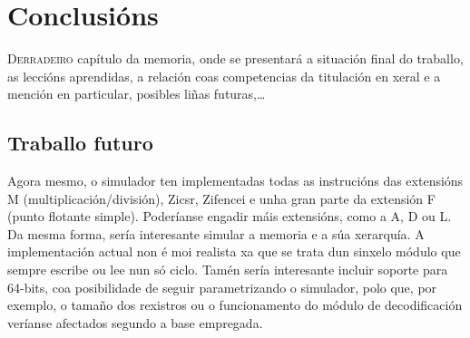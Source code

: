 \chapter{Conclusións}
\label{chap:conclusions}

\lettrine{D}{erradeiro} capítulo da memoria, onde se presentará a situación final do traballo, as leccións aprendidas, a relación coas competencias da titulación en xeral e a mención en particular, posibles liñas futuras,\dots

\section{Traballo futuro}\label{chap:traballo_futuro}
Agora mesmo, o simulador ten implementadas todas as instrucións das extensións M (multiplicación/división), Zicsr, Zifencei e unha gran parte da extensión F (punto flotante simple). Poderíanse engadir máis extensións, como a A, D ou L. Da mesma forma, sería interesante simular a memoria e a súa xerarquía. A implementación actual non é moi realista xa que se trata dun sinxelo módulo que sempre escribe ou lee nun só ciclo. Tamén sería interesante incluir soporte para 64-bits, coa posibilidade de seguir parametrizando o simulador, polo que, por exemplo, o tamaño dos rexistros ou o funcionamento do módulo de decodificación veríanse afectados segundo a base empregada.


